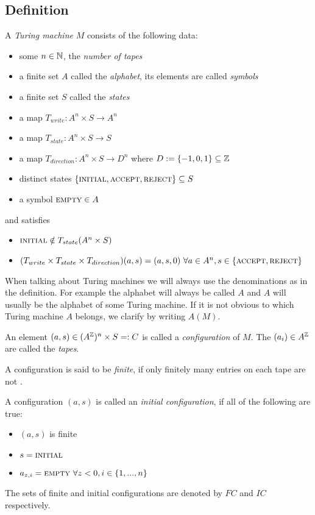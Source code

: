 \subsection{Definition}

\begin{Definition}
	A \emph{Turing machine} $M$ consists of the following data:
	\begin{itemize}
		\item{some $n \in \mathbb{N}$}, the \emph{number of tapes}
		\item{a finite set $A$ called the \emph{alphabet}, its elements are called \emph{symbols}}
		\item{a finite set $S$ called the \emph{states}}
		\item{a map $T_{write}: A^n \times S \to A^n$}
		\item{a map $T_{state}: A^n \times S \to S$}
		\item{a map $T_{direction}: A^n \times S \to D^n$ where $D := \{-1,0,1\} \subseteq \mathbb{Z}$}
		\item{distinct states $\{\text{\scshape{initial}},\text{\scshape{accept}},\text{\scshape{reject}}\} \subseteq S$}
		\item{a symbol $\text{\scshape{empty}} \in A$}
	\end{itemize}
	and satisfies
	\begin{itemize}
		\item{$\text{\scshape{initial}} \notin T_{state}(A^n \times S)$}
		\item{$(T_{write} \times T_{state} \times T_{direction}) (a,s) = (a,s,0)~\forall a \in A^n , s \in \{\text{\scshape{accept}},\text{\scshape{reject}}\}$}
	\end{itemize}
\end{Definition}
When talking about Turing machines we will always use the denominations as in the definition.
For example the alphabet will always be called $A$ and $A$ will usually be the alphabet of some Turing machine.
If it is not obvious to which Turing machine $A$ belongs, we clarify by writing $A(M)$.

An element $(a,s) \in (A^{\mathbb{Z}})^n \times S =: C$ is called a \emph{configuration} of $M$. The $(a_i) \in A^{\mathbb{Z}}$ are called the \emph{tapes}.

A configuration is said to be \emph{finite}, if only finitely many entries on each tape are not \EMP.

A configuration $(a,s)$ is called an \emph{initial configuration}, if all of the following are true:
\begin{itemize}
	\item{$(a,s)$ is finite}
	\item{$s = \text{\scshape{initial}}$}
	\item{$a_{z,i} = \text{\scshape{empty}}~\forall z < 0, i \in \{1,...,n\}$}
\end{itemize}
The sets of finite and initial configurations are denoted by $FC$ and $IC$ respectively.

